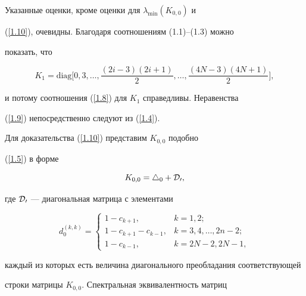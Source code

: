 \begin{pf} Указанные оценки, кроме оценки для $\lambda_{\min}(K_{0,0})$ и


(\ref{1.10}), очевидны. Благодаря соотношениям (1.1)--(1.3) можно


показать, что


\begin{equation}


K_1=\text{diag}\bigg[


0,3,\dotsc,\frac{(2i-3)(2i+1)}{2},\dotsc,


\frac{(4N-3)(4N+1)}{2}\bigg],


\label{1.11}


\end{equation}


и потому соотношения (\ref{1.8}) для $K_1$ справедливы. Неравенства


(\ref{1.9}) непосредственно следуют из (\ref{1.4}).





Для доказательства (\ref{1.10}) представим $K_{0,0}$ подобно


(\ref{1.5}) в форме


\begin{equation}


K_{0,0}=\bigtriangleup_{0}+\cal D_0,


\label{1.12}


\end{equation}


где $\cal D_0$ --- диагональная матрица с элементами


\begin{equation}\label{1.13}


d_0^{(k,k)}=


\begin{cases}


1-c_{k+1},& k=1,2;\\


1-c_{k+1}-c_{k-1},& k=3,4,\dotsc,2n-2;\\


1-c_{k-1},& k=2N-2,2N-1,


\end{cases}


\end{equation}


каждый из которых есть величина диагонального преобладания соответствующей


строки матрицы $K_{0,0}$. Спектральная эквивалентность матриц



\end{pf}
